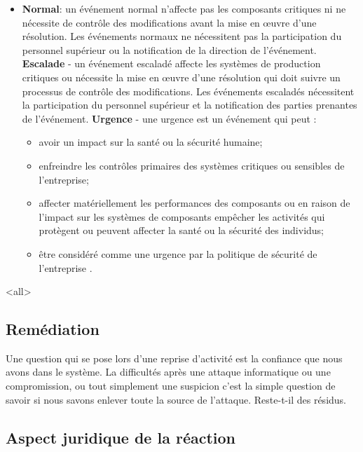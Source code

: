 \begin{itemize}
  \item  \textbf{Normal}: un événement normal n'affecte pas les composants critiques ni ne nécessite de contrôle des modifications avant la mise en œuvre d'une résolution. Les événements normaux ne nécessitent pas la participation du personnel supérieur ou la notification de la direction de l'événement.
\textbf{Escalade} - un événement escaladé affecte les systèmes de production critiques ou nécessite la mise en œuvre d'une résolution qui doit suivre un processus de contrôle des modifications. Les événements escaladés nécessitent la participation du personnel supérieur et la notification des parties prenantes de l'événement.
\textbf{Urgence} - une urgence est un événement qui peut :
\begin{itemize}
  \item avoir un impact sur la santé ou la sécurité humaine;
  \item enfreindre les contrôles primaires des systèmes critiques ou sensibles de l'entreprise;
  \item affecter matériellement les performances des composants ou en raison de l'impact sur les systèmes de composants empêcher les activités qui protègent ou peuvent affecter la santé ou la sécurité des individus;
  \item être considéré comme une urgence par la politique de sécurité de l'entreprise .
\end{itemize}

\end{itemize}

\mode<all>{}


\subsection{Remédiation}


Une question qui se pose lors d’une reprise d’activité est la confiance que nous avons dans le système. La difficultés après une attaque informatique ou une compromission, ou tout simplement une suspicion c’est la simple question de savoir si nous savons enlever toute la source de l’attaque. Reste-t-il des résidus.

\subsection{Aspect juridique de la réaction}

\utodo

